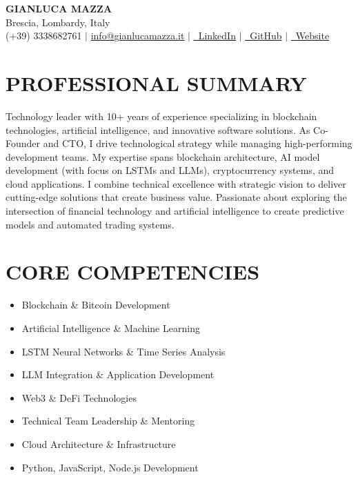 \documentclass[letterpaper,11pt]{article}
\begin{document}
\begin{center}
    \textbf{\Huge GIANLUCA MAZZA} \\
    \vspace{3pt}
    Brescia, Lombardy, Italy \\
    \vspace{1pt}
    \small (+39) 3338682761 $|$ \href{mailto:info@gianlucamazza.it}{info@gianlucamazza.it} $|$ 
    \href{https://linkedin.com/in/gianlucamazza}{\faLinkedin\ LinkedIn} $|$
    \href{https://github.com/gianlucamazza}{\faGithub\ GitHub} $|$
    \href{https://gianlucamazza.it}{\faGlobe\ Website}
\end{center}

\section{PROFESSIONAL SUMMARY}
Technology leader with 10+ years of experience specializing in blockchain technologies, artificial intelligence, and innovative software solutions. As Co-Founder and CTO, I drive technological strategy while managing high-performing development teams. My expertise spans blockchain architecture, AI model development (with focus on LSTMs and LLMs), cryptocurrency systems, and cloud applications. I combine technical excellence with strategic vision to deliver cutting-edge solutions that create business value. Passionate about exploring the intersection of financial technology and artificial intelligence to create predictive models and automated trading systems.

\section{CORE COMPETENCIES}
\begin{multicols}{2}
\begin{itemize}[leftmargin=*]
    \item Blockchain \& Bitcoin Development
    \item Artificial Intelligence \& Machine Learning
    \item LSTM Neural Networks \& Time Series Analysis
    \item LLM Integration \& Application Development
    \item Web3 \& DeFi Technologies
    \item Technical Team Leadership \& Mentoring
    \item Cloud Architecture \& Infrastructure
    \item Python, JavaScript, Node.js Development
\end{itemize}
\end{multicols}
\end{document}
